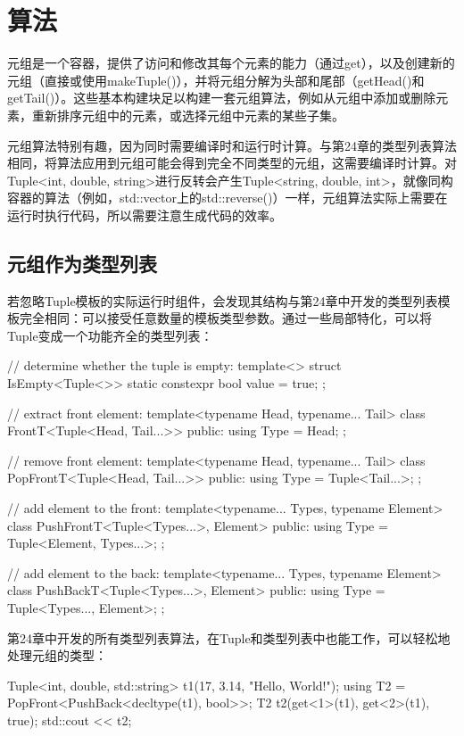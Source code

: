 \section{算法}

元组是一个容器，提供了访问和修改其每个元素的能力（通过get），以及创建新的元组（直接或使用makeTuple()），并将元组分解为头部和尾部（getHead()和getTail()）。这些基本构建块足以构建一套元组算法，例如从元组中添加或删除元素，重新排序元组中的元素，或选择元组中元素的某些子集。

元组算法特别有趣，因为同时需要编译时和运行时计算。与第24章的类型列表算法相同，将算法应用到元组可能会得到完全不同类型的元组，这需要编译时计算。对Tuple<int, double, string>进行反转会产生Tuple<string, double, int>，就像同构容器的算法（例如，std::vector上的std::reverse()）一样，元组算法实际上需要在运行时执行代码，所以需要注意生成代码的效率。

\subsection{元组作为类型列表}

若忽略Tuple模板的实际运行时组件，会发现其结构与第24章中开发的类型列表模板完全相同：可以接受任意数量的模板类型参数。通过一些局部特化，可以将Tuple变成一个功能齐全的类型列表：

\begin{cpp}
// determine whether the tuple is empty:
template<>
struct IsEmpty<Tuple<>> {
	static constexpr bool value = true;
};

// extract front element:
template<typename Head, typename... Tail>
class FrontT<Tuple<Head, Tail...>> {
	public:
	using Type = Head;
};

// remove front element:
template<typename Head, typename... Tail>
class PopFrontT<Tuple<Head, Tail...>> {
	public:
	using Type = Tuple<Tail...>;
};

// add element to the front:
template<typename... Types, typename Element>
class PushFrontT<Tuple<Types...>, Element> {
	public:
	using Type = Tuple<Element, Types...>;
};

// add element to the back:
template<typename... Types, typename Element>
class PushBackT<Tuple<Types...>, Element> {
	public:
	using Type = Tuple<Types..., Element>;
};
\end{cpp}

第24章中开发的所有类型列表算法，在Tuple和类型列表中也能工作，可以轻松地处理元组的类型：

\begin{cpp}
Tuple<int, double, std::string> t1(17, 3.14, "Hello, World!");
using T2 = PopFront<PushBack<decltype(t1), bool>>;
T2 t2(get<1>(t1), get<2>(t1), true);
std::cout << t2;
\end{cpp}

